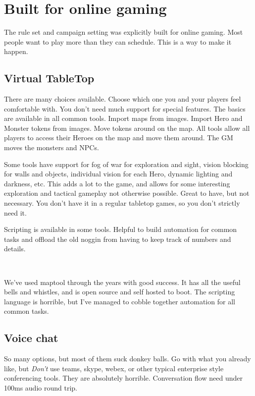 \clearpage %

\section*{Built for online gaming}

The rule set and campaign setting was explicitly built for online gaming. Most people want to play more than they can schedule. This is a way to make it happen.


\subsection*{Virtual TableTop}

There are many choices available. Choose which one you and your players feel comfortable with. You don't need much support for special features. The basics are available in all common tools. Import maps from images. Import Hero and Monster tokens from images. Move tokens around on the map. All tools allow all players to access their Heroes on the map and move them around. The GM moves the monsters and NPCs.

Some tools have support for fog of war for exploration and sight, vision blocking for walls and objects, individual vision for each Hero, dynamic lighting and darkness, etc.
This adds a lot to the game, and allows for some interesting exploration and tactical gameplay not otherwise possible.
Great to have, but not necessary. You don't have it in a regular tabletop games, so you don't strictly need it.

Scripting is available in some tools. Helpful to build automation for common tasks and offload the old noggin from having to keep track of numbers and details.

\

We've used maptool through the years with good success. It has all the useful bells and whistles, and is open source and self hosted to boot. The scripting language is horrible, but I've managed to cobble together automation for all common tasks.


\subsection*{Voice chat}

So many options, but most of them suck donkey balls. Go with what you already like, but \emph{Don't} use teams, skype, webex, or other typical enterprise style conferencing tools. They are absolutely horrible. Conversation flow need under 100ms audio round trip.

